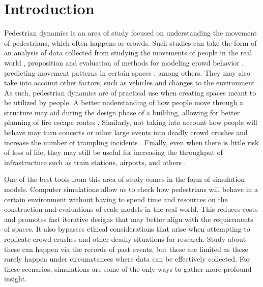 \documentclass[twoside, 11pt]{article}
\begin{document}
\clearpage            %
\null                %
\newpage             %

\mainmatter

\section{Introduction}

Pedestrian dynamics is an area of study focused on understanding the movement of pedestrians, which often happens as crowds. Such studies can take the form of an analysis of data collected from studying the movements of people in the real world \cite{adrianCrowdsFrontBottlenecks2020}, proposition and evaluation of methods for modeling crowd behavior \cite{vonkruchtenEmpiricalStudySocial2017}, predicting movement patterns in certain spaces \cite{10181234}, among others. They may also take into account other factors, such as vehicles \cite{liangUnravelingCausesSeoul2024} and changes to the environment \cite{helbingSimulatingDynamicFeatures2000}. As such, pedestrian dynamics are of practical use when creating spaces meant to be utilized by people. A better understanding of how people move through a structure may aid during the design phase of a building, allowing for better planning of fire escape routes \cite{kouskoulisSystematicReviewPedestrian2017}. Similarly, not taking into account how people will behave may turn concerts or other large events into deadly crowd crushes and increase the number of trampling incidents \cite{barrStampedesNewPsychology2024}. Finally, even when there is little risk of loss of life, they may still be useful for increasing the throughput of infrastructure such as train stations, airports, and others \cite{tesoriereModellingSimulationPassenger2018}.

One of the best tools from this area of study comes in the form of simulation models. Computer simulations allow us to check how pedestrians will behave in a certain environment without having to spend time and resources on the construction and evaluations of scale models in the real world. This reduces costs and promotes fast iterative designs that may better align with the requirements of spaces. It also bypasses ethical considerations that arise when attempting to replicate crowd crushes and other deadly situations for research. Study about these can happen via the records of past events, but these are limited as these rarely happen under circumstances where data can be effectively collected. For these scenarios, simulations are some of the only ways to gather more profound insight.
\end{document}
